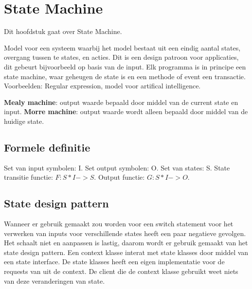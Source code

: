 \section{State Machine}
Dit hoofdstuk gaat over State Machine.

Model voor een systeem waarbij het model bestaat uit een eindig aantal states, overgang tussen te states, en acties.
Dit is een design patroon voor applicaties, dit gebeurt bijvoorbeeld op basis van de input.
Elk programma is in principe een state machine, waar geheugen de state is en een methode of event een transactie.
Voorbeelden: Regular expression, model voor artifical intelligence.

\textbf{Mealy machine}: output waarde bepaald door middel van de current state en input.
\textbf{Morre machine}: output waarde wordt alleen bepaald door middel van de huidige state.

\subsection{Formele definitie}
Set van input symbolen: I.
Set output symbolen: O.
Set van states: S.
State transitie functie: $F: S*I -> S$.
Output functie: $G: S*I -> O$.

\subsection{State design pattern}
Wanneer er gebruik gemaakt zou worden voor een switch statement voor het verwerken van inputs voor verschillende states heeft een paar negatieve gevolgen.
Het schaalt niet en aanpassen is lastig, daarom wordt er gebruik gemaakt van het state design pattern.
Een context klasse interat met state klasses door middel van een state interface.
De state klasses heeft een eigen implementatie voor de requests van uit de context.
De client die de context klasse gebruikt weet niets van deze veranderingen van state.
